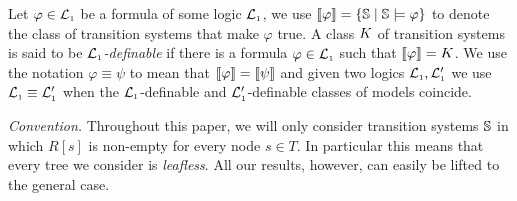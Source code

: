Let $\varphi \in \mathcal{L}_{\scriptscriptstyle 1}$ be a formula of some logic $\mathcal{L}_{\scriptscriptstyle 1}$,
we use $\llbracket\varphi\rrbracket = \{\mathbb{S} \mid \mathbb{S} \models \varphi\}$ to denote the class
of transition systems that make $\varphi$ true.
A class $K$ of transition systems is said to be \emph{$\mathcal{L}_{\scriptscriptstyle 1}$-definable} if there
is a formula $\varphi \in \mathcal{L}_{\scriptscriptstyle 1}$ such that $\llbracket\varphi\rrbracket = K$.
We use the notation $\varphi \equiv \psi$ to mean that $\llbracket\varphi\rrbracket = \llbracket\psi\rrbracket$ and given two logics
$\mathcal{L}_{\scriptscriptstyle 1}, \mathcal{L}_{\scriptscriptstyle 1}'$ we use $\mathcal{L}_{\scriptscriptstyle 1} \equiv \mathcal{L}_{\scriptscriptstyle 1}'$ when the $\mathcal{L}_{\scriptscriptstyle 1}$-definable and $\mathcal{L}_{\scriptscriptstyle 1}'$-definable
classes of models coincide.

\textit{Convention.}
Throughout this paper, we will only consider transition systems $\mathbb{S}$
in which $R[s]$ is non-empty for every node $s \in T$.
In particular this means that every tree we consider is \emph{leafless}.
All our results, however, can easily be lifted to the general case.